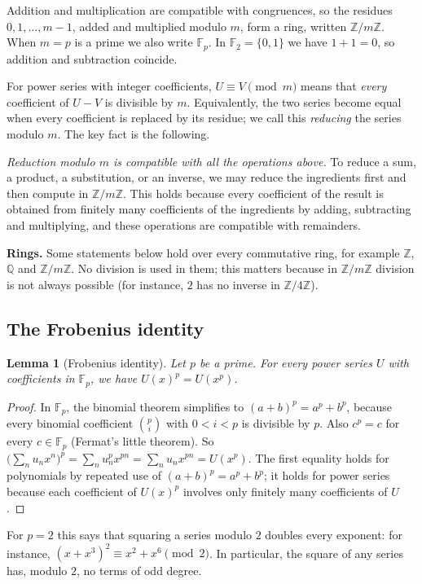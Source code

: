 \documentclass[11pt,a4paper]{article}
\newtheorem{lemma}[theorem]{Lemma}
\theoremstyle{definition}
\theoremstyle{remark}
\newcommand{\Z}{\mathbb{Z}}
\newcommand{\Q}{\mathbb{Q}}
\newcommand{\F}{\mathbb{F}}
\newcommand{\para}[1]{\par\medskip\noindent\textbf{#1}\enspace}
\begin{document}
Addition and multiplication are compatible with congruences, so the residues $0,1,\dots,m-1$, added and multiplied
modulo $m$, form a ring, written $\Z/m\Z$. When $m=p$ is a prime we also write $\F_p$. In $\F_2=\{0,1\}$ we have $1+1=0$,
so addition and subtraction coincide.

For power series with integer coefficients, $U\equiv V\pmod m$ means that \emph{every} coefficient of $U-V$ is
divisible by $m$. Equivalently, the two series become equal when every coefficient is replaced by its residue; we call
this \emph{reducing} the series modulo $m$. The key fact is the following.

\emph{Reduction modulo $m$ is compatible with all the operations above.} To reduce a sum, a product, a substitution, or
an inverse, we may reduce the ingredients first and then compute in $\Z/m\Z$. This holds because every
coefficient of the result is obtained from finitely many coefficients of the ingredients by adding, subtracting and
multiplying, and these operations are compatible with remainders.

\para{Rings.} Some statements below hold over every commutative ring, for example $\Z$, $\Q$ and $\Z/m\Z$. No
division is used in them; this matters because in $\Z/m\Z$ division is not always possible (for instance, $2$ has no inverse in
$\Z/4\Z$).

\subsection{The Frobenius identity}
\begin{lemma}[Frobenius identity]\label{lem:frobenius}
Let $p$ be a prime. For every power series $U$ with coefficients in $\F_p$, we have $U(x)^p=U(x^p)$.
\end{lemma}

\begin{proof}
In $\F_p$, the binomial theorem simplifies to $(a+b)^p=a^p+b^p$, because every binomial coefficient
$\binom pi$ with $0<i<p$ is divisible by $p$. Also $c^p=c$ for every $c\in\F_p$ (Fermat's little theorem). So
$\bigl(\sum_nu_nx^n\bigr)^p=\sum_nu_n^px^{pn}=\sum_nu_nx^{pn}=U(x^p)$. The first equality holds for polynomials by
repeated use of $(a+b)^p=a^p+b^p$; it holds for power series because each coefficient of $U(x)^p$ involves only finitely
many coefficients of $U$.
\end{proof}

For $p=2$ this says that squaring a series modulo $2$ doubles every exponent: for instance,
$(x+x^3)^2\equiv x^2+x^6\pmod2$. In particular, the square of any series has, modulo $2$, no terms of odd degree.
\end{document}
